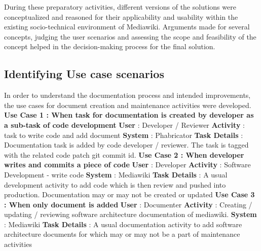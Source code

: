 During these preparatory activities, different versions of the solutions were conceptualized and reasoned for their applicability and usability within the existing socio-technical environment of Mediawiki.
Arguments made for several concepts, judging the user scenarios and assessing the scope and feasibility of the concept helped in the decision-making process for the final solution.


\subsection{Identifying Use case scenarios }
In order to understand the documentation process and intended improvements, the use cases for document creation and maintenance activities were developed.
\newline \newline
\indent \textbf{Use Case 1 : When task for documentation is created by developer as a sub-task of code development}
\newline \textbf{User} : Developer / Reviewer
\newline \textbf{Activity} : task to write code and add document
\newline \textbf{System} : Phabricator
\newline \textbf{Task Details} : Documentation task is added by code developer / reviewer. The task is tagged with the related code patch git commit id.
\newline \newline
\indent \textbf{Use Case 2 : When developer writes and commits a piece of code}
\newline \textbf{User} : Developer
\newline \textbf{Activity} : Software Development - write code
\newline \textbf{System} : Mediawiki
\newline \textbf{Task Details} : A usual development activity to add code which is then review and pushed into production. Documentation may or may not be created or updated
\newline \newline
\indent \textbf{Use Case 3 : When only document is added}
\newline \textbf{User} : Documenter
\newline \textbf{Activity} : Creating / updating / reviewing software architecture documentation of mediawiki.
\newline \textbf{System} : Mediawiki
\newline \textbf{Task Details} : A usual documentation activity to add software architecture documents for which may or may not be a part of maintenance activities
